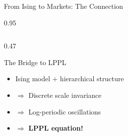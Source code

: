 \documentclass[9pt, aspectratio=169, t]{beamer}
\begin{document}
\begin{frame}{From Ising to Markets: The Connection}
\begin{cminipage}{0.95\textwidth}
{\begin{columns}[T]
\begin{column}{0.47\textwidth}
            \begin{block}{The Bridge to LPPL}
                \begin{itemize}\setlength{\itemsep}{0pt}
                    \item Ising model + hierarchical structure
                    \item $\Rightarrow$ Discrete scale invariance
                    \item $\Rightarrow$ Log-periodic oscillations
                    \item $\Rightarrow$ \textbf{LPPL equation!}
                \end{itemize}
            \end{block}
        \end{column}
    \end{columns}
    }
    \end{cminipage}
\end{frame}
\end{document}
